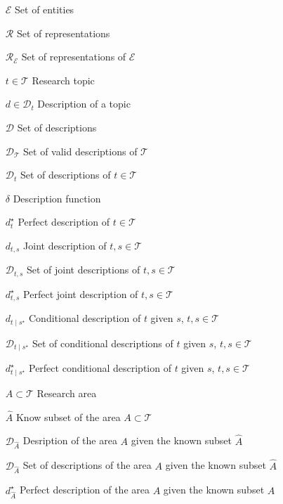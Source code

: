 \begin{itemize}
%
%

\bigskip

\item [$\mathcal{E}$] Set of entities
\item [$\mathcal{R}$] Set of representations
\item [$\mathcal{R}_\mathcal{E}$] Set of representations of $\mathcal{E}$
\item [$t \in \mathcal{T}$] Research topic
\item [$d \in \mathcal{D}_t$] Description of a topic
\item [$\mathcal{D}$] Set of descriptions
\item [$\mathcal{D}_{\mathcal{T}}$] Set of valid descriptions of $\mathcal{T}$
\item [$\mathcal{D}_t$] Set of descriptions of $t \in \mathcal{T}$
\item [$\delta$] Description function
\item [$d_{t}^{\star}$] Perfect description of $t \in \mathcal{T}$
\item [$d_{t,s}$] Joint description of $t, s \in \mathcal{T}$
\item [$\mathcal{D}_{t,s}$] Set of joint descriptions of $t, s \in \mathcal{T}$
\item [$d_{t,s}^{\star}$] Perfect joint description of $t, s \in \mathcal{T}$
\item [$d_{t \mid s^\star}$] Conditional description of $t$ given $s$, $t, s \in \mathcal{T}$
\item [$\mathcal{D}_{t \mid s^\star}$] Set of conditional descriptions of $t$ given $s$, $t, s \in \mathcal{T}$
\item [$d_{t \mid s^\star}^{\star}$] Perfect conditional description of $t$ given $s$, $t, s \in \mathcal{T}$
\item [$A \subset \mathcal{T}$] Research area
\item [$\hat{A}$] Know subset of the area $A \subset \mathcal{T}$
\item [$\mathcal{D}_{\hat{A}}$] Desription of the area $A$ given the known subset $\hat{A}$
\item [$\mathcal{D}_{\hat{A}}$] Set of descriptions of the area $A$ given the known subset $\hat{A}$
\item [$d_{\hat{A}}^{\star}$] Perfect description of the area $A$ given the known subset $\hat{A}$

%
%

\bigskip


\end{itemize}
